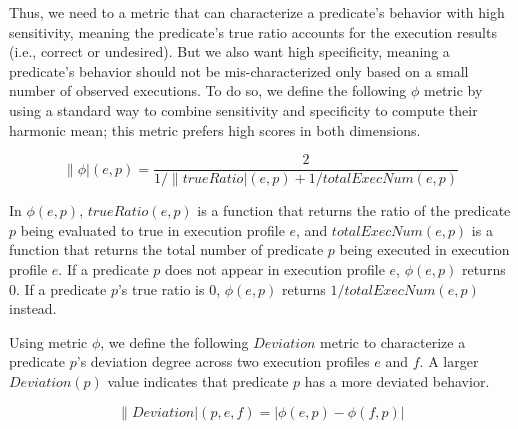 
Thus, we need to a metric that can characterize
a predicate's behavior with high sensitivity, meaning the predicate's true
ratio accounts for the execution results (i.e., correct or undesired).
But we also want
high specificity, meaning a predicate's behavior should not be
mis-characterized only based on a small number of
observed executions. To do so, we define the following
$\phi$ metric by using a standard way to
combine sensitivity and specificity to compute their
harmonic mean; this metric prefers high scores in both dimensions. 

\vspace{-3mm}

{\small{
\[
\|\phi|(e, p) = \frac{2}{{1}/{\|trueRatio|(e, p)} + {1}/{totalExecNum(e, p)}}
\]
}}

\vspace{-3mm}

In $\phi(e, p)$, $trueRatio(e, p)$ is a function that returns the ratio of the predicate $p$ being
evaluated to true in execution profile $e$, and $totalExecNum(e, p)$ is a function
that returns the total number of predicate $p$ being executed in execution profile $e$.
If a predicate $p$ does not appear in execution profile $e$, 
$\phi(e, p)$ returns 0. If a predicate $p$'s true ratio is 0, $\phi(e, p)$ returns
$1/totalExecNum(e, p)$ instead.


Using metric $\phi$, we define the following $Deviation$ metric
to characterize a predicate $p$'s deviation degree across two execution
profiles $e$ and $f$. A larger $Deviation(p)$ value indicates that
predicate $p$ has a more deviated behavior. %

\vspace{-2mm}

{\small{
\[
\|Deviation|(p, e, f) = |\phi(e, p) - \phi(f, p)|
\]
}}
\vspace{-4mm}

